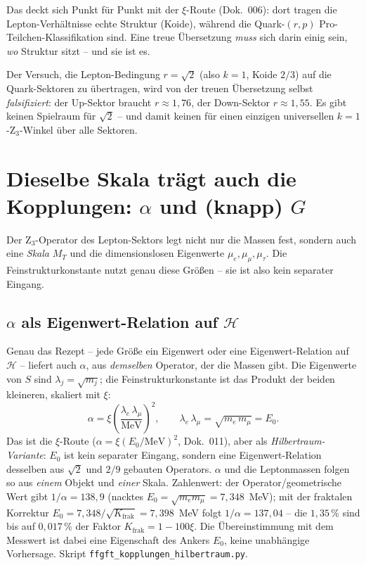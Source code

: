 Das deckt sich Punkt für Punkt mit der $\xi$-Route (Dok.~006): dort tragen die
Lepton-Verhältnisse echte Struktur (Koide), während die Quark-$(r,p)$
Pro-Teilchen-Klassifikation sind. Eine treue Übersetzung \emph{muss} sich darin
einig sein, \emph{wo} Struktur sitzt -- und sie ist es.

\begin{keyresult}
Der Versuch, die Lepton-Bedingung $r=\sqrt2$ (also $k=1$, Koide $2/3$) auf die
Quark-Sektoren zu übertragen, wird von der treuen Übersetzung selbst
\emph{falsifiziert}: der Up-Sektor braucht $r\approx1{,}76$, der Down-Sektor
$r\approx1{,}55$. Es gibt keinen Spielraum für $\sqrt2$ -- und damit keinen für
einen einzigen universellen $k=1$-Z$_3$-Winkel über alle Sektoren.
\end{keyresult}

\section{Dieselbe Skala trägt auch die Kopplungen: $\alpha$ und (knapp) $G$}

Der Z$_3$-Operator des Lepton-Sektors legt nicht nur die Massen fest, sondern
auch eine \emph{Skala} $M_T$ und die dimensionslosen Eigenwerte
$\mu_e,\mu_\mu,\mu_\tau$. Die Feinstrukturkonstante nutzt genau diese Größen --
sie ist also kein separater Eingang.

\subsection{$\alpha$ als Eigenwert-Relation auf $\mathcal H$}

Genau das Rezept -- jede Größe ein Eigenwert oder eine Eigenwert-Relation auf
$\mathcal H$ -- liefert auch $\alpha$, aus \emph{demselben} Operator, der die
Massen gibt. Die Eigenwerte von $S$ sind $\lambda_j=\sqrt{m_j}$; die
Feinstrukturkonstante ist das Produkt der beiden kleineren, skaliert mit $\xi$:
\begin{equation}
  \alpha=\xi\left(\frac{\lambda_e\,\lambda_\mu}{\mathrm{MeV}}\right)^2,
  \qquad \lambda_e\,\lambda_\mu=\sqrt{m_e\,m_\mu}=E_0 .
\end{equation}
Das ist die $\xi$-Route ($\alpha=\xi(E_0/\mathrm{MeV})^2$, Dok.~011), aber als
\emph{Hilbertraum-Variante}: $E_0$ ist kein separater Eingang, sondern eine
Eigenwert-Relation desselben aus $\sqrt2$ und $2/9$ gebauten Operators. $\alpha$
und die Leptonmassen folgen so aus \emph{einem} Objekt und \emph{einer} Skala.
Zahlenwert: der Operator/geometrische Wert gibt $1/\alpha=138{,}9$ (nacktes
$E_0 = \sqrt{m_e m_\mu} = 7{,}348$~MeV); mit der fraktalen Korrektur
$E_0 = 7{,}348/\sqrt{K_{\text{frak}}} = 7{,}398$~MeV folgt $1/\alpha=137{,}04$ --
die $1{,}35\,\%$ sind bis auf $0{,}017\,\%$ der Faktor $K_{\text{frak}} = 1-100\xi$. Die Übereinstimmung mit dem Messwert ist dabei eine Eigenschaft des Ankers $E_0$, keine unabhängige Vorhersage. Skript
\texttt{ffgft\_kopplungen\_hilbertraum.py}.

